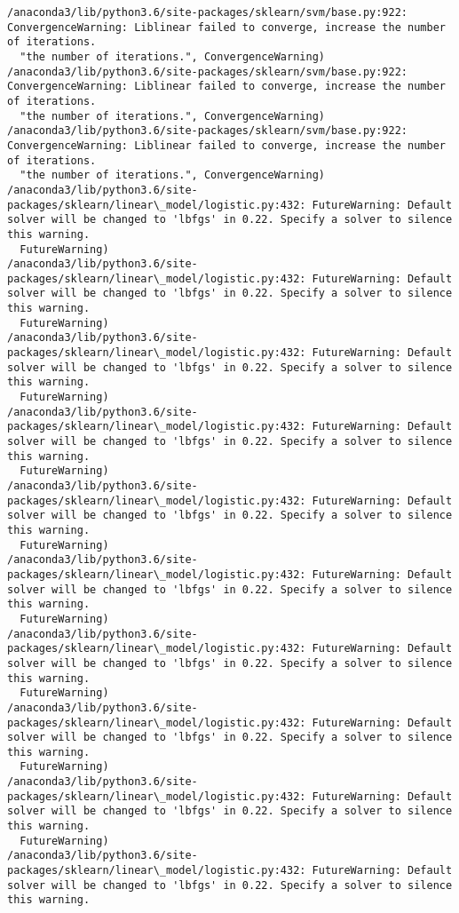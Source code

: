 \documentclass[11pt]{article}
\begin{document}
\begin{Verbatim}[commandchars=\\\{\}]
/anaconda3/lib/python3.6/site-packages/sklearn/svm/base.py:922: ConvergenceWarning: Liblinear failed to converge, increase the number of iterations.
  "the number of iterations.", ConvergenceWarning)
/anaconda3/lib/python3.6/site-packages/sklearn/svm/base.py:922: ConvergenceWarning: Liblinear failed to converge, increase the number of iterations.
  "the number of iterations.", ConvergenceWarning)
/anaconda3/lib/python3.6/site-packages/sklearn/svm/base.py:922: ConvergenceWarning: Liblinear failed to converge, increase the number of iterations.
  "the number of iterations.", ConvergenceWarning)
/anaconda3/lib/python3.6/site-packages/sklearn/linear\_model/logistic.py:432: FutureWarning: Default solver will be changed to 'lbfgs' in 0.22. Specify a solver to silence this warning.
  FutureWarning)
/anaconda3/lib/python3.6/site-packages/sklearn/linear\_model/logistic.py:432: FutureWarning: Default solver will be changed to 'lbfgs' in 0.22. Specify a solver to silence this warning.
  FutureWarning)
/anaconda3/lib/python3.6/site-packages/sklearn/linear\_model/logistic.py:432: FutureWarning: Default solver will be changed to 'lbfgs' in 0.22. Specify a solver to silence this warning.
  FutureWarning)
/anaconda3/lib/python3.6/site-packages/sklearn/linear\_model/logistic.py:432: FutureWarning: Default solver will be changed to 'lbfgs' in 0.22. Specify a solver to silence this warning.
  FutureWarning)
/anaconda3/lib/python3.6/site-packages/sklearn/linear\_model/logistic.py:432: FutureWarning: Default solver will be changed to 'lbfgs' in 0.22. Specify a solver to silence this warning.
  FutureWarning)
/anaconda3/lib/python3.6/site-packages/sklearn/linear\_model/logistic.py:432: FutureWarning: Default solver will be changed to 'lbfgs' in 0.22. Specify a solver to silence this warning.
  FutureWarning)
/anaconda3/lib/python3.6/site-packages/sklearn/linear\_model/logistic.py:432: FutureWarning: Default solver will be changed to 'lbfgs' in 0.22. Specify a solver to silence this warning.
  FutureWarning)
/anaconda3/lib/python3.6/site-packages/sklearn/linear\_model/logistic.py:432: FutureWarning: Default solver will be changed to 'lbfgs' in 0.22. Specify a solver to silence this warning.
  FutureWarning)
/anaconda3/lib/python3.6/site-packages/sklearn/linear\_model/logistic.py:432: FutureWarning: Default solver will be changed to 'lbfgs' in 0.22. Specify a solver to silence this warning.
  FutureWarning)
/anaconda3/lib/python3.6/site-packages/sklearn/linear\_model/logistic.py:432: FutureWarning: Default solver will be changed to 'lbfgs' in 0.22. Specify a solver to silence this warning.

\end{Verbatim}
\end{document}

